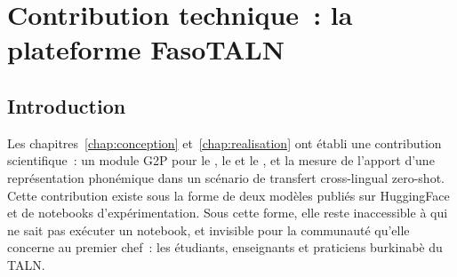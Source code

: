 
\usetikzlibrary{shapes.geometric}


\newcommand{\captureareserver}[3]{%
	\begin{figure}[H]
		\centering
		\fbox{\parbox[c][3.2cm][c]{0.72\textwidth}{\centering\footnotesize
				\textit{Capture d'écran à insérer~:} \texttt{#1}}}
		\caption{#2}
		\label{fig:#3}
	\end{figure}
}

\chapter{Contribution technique~: la plateforme FasoTALN}
\label{chap:contribution-technique}

\section{Introduction}

Les chapitres~\ref{chap:conception} et~\ref{chap:realisation} ont établi une
contribution scientifique~: un module G2P pour le , le
 et le , et la mesure de l'apport d'une
représentation phonémique dans un scénario de transfert cross-lingual zero-shot.
Cette contribution existe sous la forme de deux modèles publiés sur HuggingFace et
de notebooks d'expérimentation. Sous cette forme, elle reste inaccessible à qui ne
sait pas exécuter un notebook, et invisible pour la communauté qu'elle concerne au
premier chef~: les étudiants, enseignants et praticiens burkinabè du TALN.

